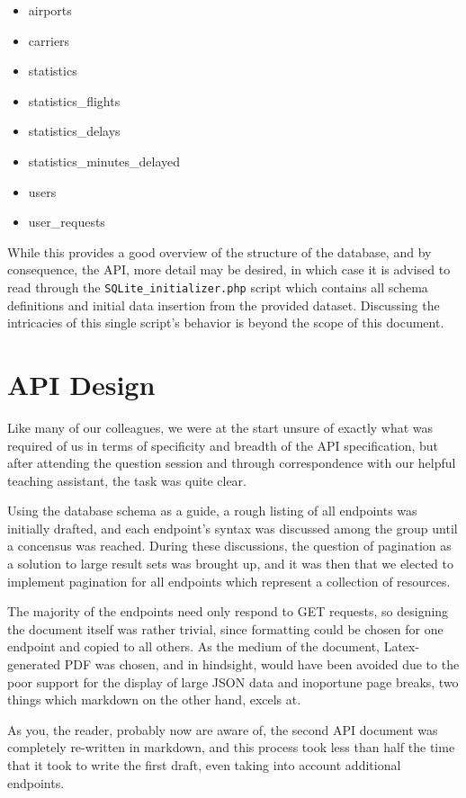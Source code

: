 \documentclass[12pt, a4paper, notitlepage]{report}
\begin{document}
		\begin{itemize}
			\item airports
			\item carriers
			\item statistics
			\item statistics\_flights
			\item statistics\_delays
			\item statistics\_minutes\_delayed
			\item users
			\item user\_requests
		\end{itemize}
		
		While this provides a good overview of the structure of the database, and by consequence, the API, more detail may be desired, in which case it is advised to read through the \texttt{SQLite\_initializer.php} script which contains all schema definitions and initial data insertion from the provided dataset. Discussing the intricacies of this single script's behavior is beyond the scope of this document.
		
	\section*{API Design}
		Like many of our colleagues, we were at the start unsure of exactly what was required of us in terms of specificity and breadth of the API specification, but after attending the question session and through correspondence with our helpful teaching assistant, the task was quite clear.
		
		Using the database schema as a guide, a rough listing of all endpoints was initially drafted, and each endpoint's syntax was discussed among the group until a concensus was reached. During these discussions, the question of pagination as a solution to large result sets was brought up, and it was then that we elected to implement pagination for all endpoints which represent a collection of resources.
		
		The majority of the endpoints need only respond to GET requests, so designing the document itself was rather trivial, since formatting could be chosen for one endpoint and copied to all others. As the medium of the document, Latex-generated PDF was chosen, and in hindsight, would have been avoided due to the poor support for the display of large JSON data and inoportune page breaks, two things which markdown on the other hand, excels at.
		
		As you, the reader, probably now are aware of, the second API document was completely re-written in markdown, and this process took less than half the time that it took to write the first draft, even taking into account additional endpoints.
		
\end{document}
